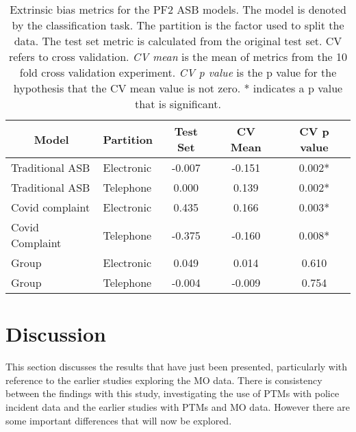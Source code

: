 \begin{table}[]
\begin{tabular}{@{}llccc@{}}
\multicolumn{1}{c}{Model} & \multicolumn{1}{c}{Partition} & Test Set & CV Mean & CV p value \\ \midrule
Traditional ASB                                   & Electronic                                            & -0.007   & -0.151  & 0.002*      \\
Traditional ASB                                   & Telephone                                             & 0.000    & 0.139   & 0.002*      \\
Covid complaint                                   & Electronic                                            & 0.435    & 0.166   & 0.003*      \\
Covid Complaint                                   & Telephone                                             & -0.375   & -0.160  & 0.008*      \\
Group                                         & Electronic                                            & 0.049    & 0.014   & 0.610      \\
Group                                         & Telephone                                             & -0.004   & -0.009  & 0.754      \\ \bottomrule
\end{tabular}
\caption[ASB incident logs Bias Table]{\label{tab:asb_bias} Extrinsic bias metrics for the PF2 ASB models. The model is denoted by the classification task. The partition is the factor used to split the data. The test set metric is calculated from the original test set. CV refers to cross validation. \emph{CV mean} is the mean of metrics from the 10 fold cross validation experiment. \emph{CV p value} is the p value for the hypothesis that the CV mean value is not zero. * indicates a p value that is significant.}
\end{table}

\section{Discussion} This section discusses the results that have just been presented, particularly with reference to the earlier studies exploring the MO data.  There is consistency between the findings with this study, investigating the use of PTMs with police incident data and the earlier studies with PTMs and MO data. However there are some important differences that will now be explored.


